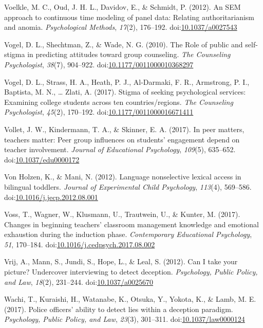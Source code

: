 \documentclass[english,man]{apa6}
\theoremstyle{definition}
\theoremstyle{definition}
\theoremstyle{definition}
\theoremstyle{remark}
\begin{document}
\hypertarget{ref-Voelkle2012}{}
Voelkle, M. C., Oud, J. H. L., Davidov, E., \& Schmidt, P. (2012). An
SEM approach to continuous time modeling of panel data: Relating
authoritarianism and anomia. \emph{Psychological Methods}, \emph{17}(2),
176--192. doi:\href{https://doi.org/10.1037/a0027543}{10.1037/a0027543}

\hypertarget{ref-Vogel2010}{}
Vogel, D. L., Shechtman, Z., \& Wade, N. G. (2010). The Role of public
and self-stigma in predicting attitudes toward group counseling.
\emph{The Counseling Psychologist}, \emph{38}(7), 904--922.
doi:\href{https://doi.org/10.1177/0011000010368297}{10.1177/0011000010368297}

\hypertarget{ref-Vogel2017}{}
Vogel, D. L., Strass, H. A., Heath, P. J., Al-Darmaki, F. R., Armstrong,
P. I., Baptista, M. N., \ldots{} Zlati, A. (2017). Stigma of seeking
psychological services: Examining college students across ten
countries/regions. \emph{The Counseling Psychologist}, \emph{45}(2),
170--192.
doi:\href{https://doi.org/10.1177/0011000016671411}{10.1177/0011000016671411}

\hypertarget{ref-Vollet2017}{}
Vollet, J. W., Kindermann, T. A., \& Skinner, E. A. (2017). In peer
matters, teachers matter: Peer group influences on students' engagement
depend on teacher involvement. \emph{Journal of Educational Psychology},
\emph{109}(5), 635--652.
doi:\href{https://doi.org/10.1037/edu0000172}{10.1037/edu0000172}

\hypertarget{ref-VonHolzen2012}{}
Von Holzen, K., \& Mani, N. (2012). Language nonselective lexical access
in bilingual toddlers. \emph{Journal of Experimental Child Psychology},
\emph{113}(4), 569--586.
doi:\href{https://doi.org/10.1016/j.jecp.2012.08.001}{10.1016/j.jecp.2012.08.001}

\hypertarget{ref-Voss2017}{}
Voss, T., Wagner, W., Klusmann, U., Trautwein, U., \& Kunter, M. (2017).
Changes in beginning teachers' classroom management knowledge and
emotional exhaustion during the induction phase. \emph{Contemporary
Educational Psychology}, \emph{51}, 170--184.
doi:\href{https://doi.org/10.1016/j.cedpsych.2017.08.002}{10.1016/j.cedpsych.2017.08.002}

\hypertarget{ref-Vrij2012}{}
Vrij, A., Mann, S., Jundi, S., Hope, L., \& Leal, S. (2012). Can I take
your picture? Undercover interviewing to detect deception.
\emph{Psychology, Public Policy, and Law}, \emph{18}(2), 231--244.
doi:\href{https://doi.org/10.1037/a0025670}{10.1037/a0025670}

\hypertarget{ref-Wachi2017}{}
Wachi, T., Kuraishi, H., Watanabe, K., Otsuka, Y., Yokota, K., \& Lamb,
M. E. (2017). Police officers' ability to detect lies within a deception
paradigm. \emph{Psychology, Public Policy, and Law}, \emph{23}(3),
301--311.
doi:\href{https://doi.org/10.1037/law0000124}{10.1037/law0000124}
\end{document}

